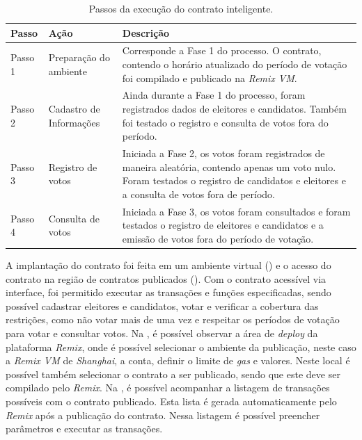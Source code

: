 \documentclass[portuguese]{textolivre}
\begin{document}
	\begin{table}[htbp]
		\centering
		\caption{Passos da execução do contrato inteligente.}
		\label{execuçaocontarto}
		\begin{tabularx}{\textwidth}{YYY}
			\toprule
			\textbf{Passo} & \textbf{Ação}  & \textbf{Descrição} \\
			\midrule
			Passo 1 & Preparação do ambiente & Corresponde a Fase 1 do processo. O contrato, contendo o horário atualizado do período de votação foi compilado e publicado na \textit{Remix VM}.\\
			\midrule
			Passo 2 & Cadastro de Informações & Ainda durante a Fase 1 do processo, foram registrados dados de eleitores e candidatos. Também foi testado o registro e consulta de votos fora do período. \\
			\midrule
			Passo 3 & Registro de votos & Iniciada a Fase 2, os votos foram registrados de maneira aleatória, contendo apenas um voto nulo. Foram testados o registro de candidatos e eleitores e a consulta de votos fora de período. \\
			\midrule
			Passo 4 & Consulta de votos & Iniciada a Fase 3, os votos foram consultados e foram testados o registro de eleitores e candidatos e a emissão de votos fora do período de votação. \\
			\bottomrule
		\end{tabularx}
	\end{table} 
	
	
	A implantação do contrato foi feita em um ambiente virtual () e o acesso do contrato na região de contratos publicados (). Com o contrato acessível via interface, foi permitido executar as transações e funções especificadas, sendo possível cadastrar eleitores e candidatos, votar e verificar a cobertura das restrições, como não votar mais de uma vez e respeitar os períodos de votação para votar e consultar votos. %
	Na , é possível observar a área de \textit{deploy} da plataforma \textit{Remix}, onde é possível selecionar o ambiente da publicação, neste caso a \textit{Remix VM} de \textit{Shanghai}, a conta, definir o limite de \textit{gas} e valores. Neste local é possível também selecionar o contrato a ser publicado, sendo que este deve ser compilado pelo \textit{Remix}.
	Na , é possível acompanhar a listagem de transações possíveis com o contrato publicado. Esta lista é gerada automaticamente pelo \textit{Remix} após a publicação do contrato. Nessa listagem é possível preencher parâmetros e executar as transações.
	
\end{document}
